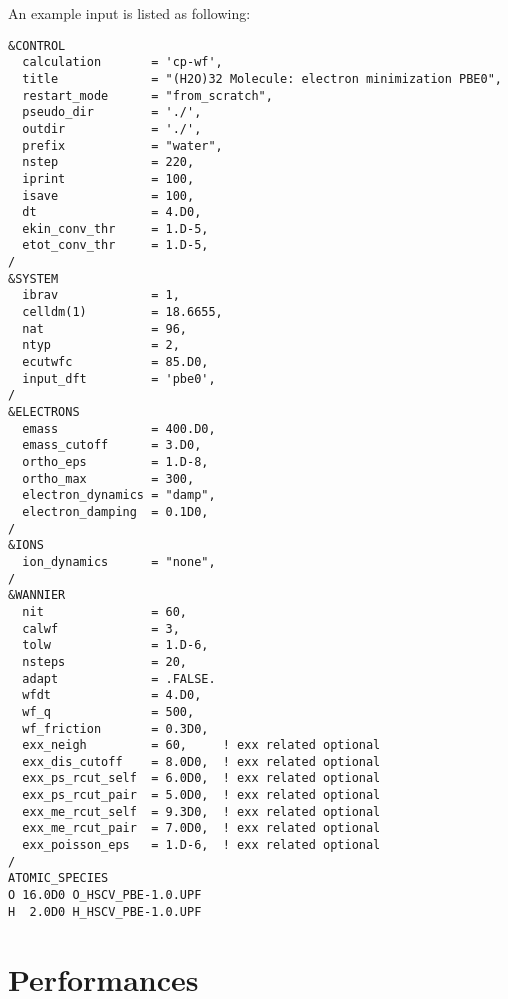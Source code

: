 \documentclass[12pt,a4paper]{article}
\begin{document}
An example input is listed as following:
\begin{verbatim}
&CONTROL
  calculation       = 'cp-wf',
  title             = "(H2O)32 Molecule: electron minimization PBE0",
  restart_mode      = "from_scratch",
  pseudo_dir        = './',
  outdir            = './',
  prefix            = "water",
  nstep             = 220,
  iprint            = 100,
  isave             = 100,
  dt                = 4.D0,
  ekin_conv_thr     = 1.D-5,
  etot_conv_thr     = 1.D-5,
/
&SYSTEM
  ibrav             = 1,
  celldm(1)         = 18.6655, 
  nat               = 96,
  ntyp              = 2,
  ecutwfc           = 85.D0,
  input_dft         = 'pbe0',
/
&ELECTRONS
  emass             = 400.D0,
  emass_cutoff      = 3.D0,
  ortho_eps         = 1.D-8,
  ortho_max         = 300,
  electron_dynamics = "damp",
  electron_damping  = 0.1D0,
/
&IONS
  ion_dynamics      = "none", 
/
&WANNIER
  nit               = 60,
  calwf             = 3,
  tolw              = 1.D-6,
  nsteps            = 20,
  adapt             = .FALSE.
  wfdt              = 4.D0,
  wf_q              = 500,
  wf_friction       = 0.3D0,
  exx_neigh         = 60,     ! exx related optional
  exx_dis_cutoff    = 8.0D0,  ! exx related optional
  exx_ps_rcut_self  = 6.0D0,  ! exx related optional
  exx_ps_rcut_pair  = 5.0D0,  ! exx related optional
  exx_me_rcut_self  = 9.3D0,  ! exx related optional
  exx_me_rcut_pair  = 7.0D0,  ! exx related optional
  exx_poisson_eps   = 1.D-6,  ! exx related optional
/
ATOMIC_SPECIES
O 16.0D0 O_HSCV_PBE-1.0.UPF
H  2.0D0 H_HSCV_PBE-1.0.UPF 
\end{verbatim}


\section{Performances}



\end{document}
